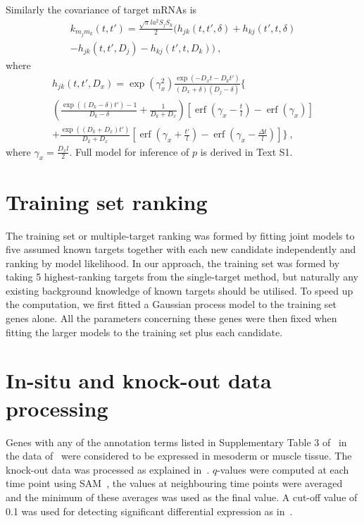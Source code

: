 \documentclass{pnastwo}
\newcommand{\erf}{\operatorname{erf}}
\begin{document}
\begin{article}
\begin{materials}
  Similarly the covariance of target mRNAs is
  \begin{multline*}
    k_{m_j m_k}(t, t')
    = \frac{\sqrt{\pi} l a^2 S_j S_k}{2} \bigg(
    h_{jk}(t, t', \delta) + h_{kj}(t', t, \delta) \\
    - h_{jk}(t, t', D_j) - h_{kj}(t', t, D_k)
    \bigg)\ ,
  \end{multline*}
  where
  \begin{multline*}
    h_{jk}(t, t', D_x) = 
    \exp\left(\gamma_x^2\right)
    \frac{\exp(-D_x t - D_k t')}{(D_x + \delta) (D_j - \delta)}
    \bigg\{ 
    \\
    \left(\frac{\exp((D_k-\delta) t') - 1}{D_k-\delta} +
      \frac{1}{D_k + D_x} \right)
    \left[\erf\left(\gamma_x - \frac{t}{l}\right) - \erf\left(\gamma_x\right)\right]
    \\
    + \frac{\exp((D_k+D_x)t')}{D_k+D_x}
    \left[\erf\left(\gamma_x + \frac{t'}{l}\right)
    - \erf\left(\gamma_x - \frac{\Delta t}{l}\right)\right]
    \bigg\}\ ,
  \end{multline*}
  where $\gamma_x = \frac{D_x l}{2}$.
  Full model for inference of $p$ is derived in Text S1.

  \section{Training set ranking}
  The training set or multiple-target ranking was formed by fitting
  joint models to five assumed known targets together with each new
  candidate independently and ranking by model likelihood.  In our
  approach, the training set was formed by taking 5 highest-ranking
  targets from the single-target method, but naturally any existing background
  knowledge of known targets should be utilised.  To speed up the
  computation, we first fitted a Gaussian process model to the
  training set genes alone.  All the parameters concerning these genes
  were then fixed when fitting the larger models to the training set
  plus each candidate.

  \section{In-situ and knock-out data processing}
  Genes with any of the annotation terms listed in Supplementary Table
  3 of~\cite{Zinzen2009} in the data of~\cite{Tomancak2002} were
  considered to be expressed in mesoderm or muscle tissue.
  The knock-out data was processed as explained
  in~\cite{Sandmann2006a}.  $q$-values were computed at each time
  point using SAM~\cite{Saeed2003,Tusher2001}, the values at
  neighbouring time points were averaged and the minimum of these
  averages was used as the final value.  A cut-off value of 0.1 was
  used for detecting significant differential expression as
  in~\cite{Sandmann2006a}.


\end{materials}
\end{article}
\end{document}
